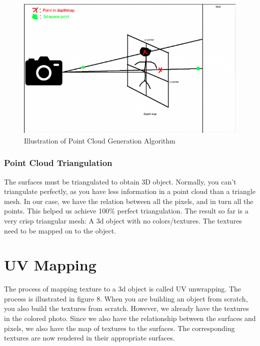 \documentclass{article}
\begin{document}
	\begin{figure}[H]
		\centering
		\includegraphics[width=15cm]{images/pointCloudGenerationAlgorithm.png}
		\caption{Illustration of Point Cloud Generation Algorithm}
	\end{figure}		
    
    \subsubsection{Point Cloud Triangulation}
    The surfaces must be triangulated to obtain 3D object. Normally, you can’t triangulate perfectly, as you have less information in a point cloud than a triangle mesh. In our case, we have the relation between all the pixels, and in turn all the points. This helped us achieve 100\% perfect triangulation. The result so far is a very crisp triangular mesh: A 3d object with no colors/textures. The textures need to be mapped on to the object.
\section{UV Mapping}
The process of mapping texture to a 3d object is called UV unwrapping. The process is illustrated in figure 8. When you are building an object from scratch, you also build the textures from scratch. However, we already have the textures in the colored photo. Since we also have the relationship between the surfaces and pixels, we also have the map of textures to the surfaces. The corresponding textures are now rendered in their appropriate surfaces.
\end{document}
